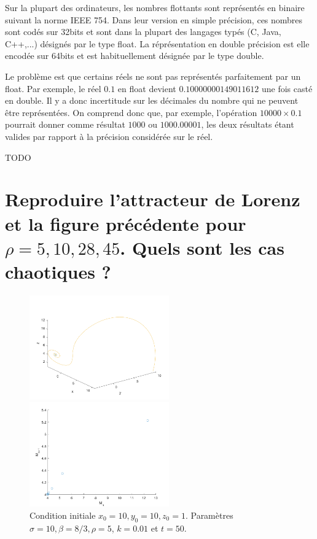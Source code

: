 \documentclass[a4paper, 12pt]{report}
\newcommand{\code}[1]{\textsf{#1}}
\begin{document}
Sur la plupart des ordinateurs, les nombres flottants sont représentés
en binaire suivant la norme IEEE 754. Dans leur version en simple précision,
ces nombres sont codés sur 32bits et sont dans la plupart des langages typés
(C, Java, C++,...) désignés par le type \code{float}. La réprésentation en
double précision est elle encodée sur 64bits et est habituellement désignée
par le type \code{double}.

Le problème est que certains réels ne sont pas représentés parfaitement
par un \code{float}. Par exemple, le réel $0.1$ en \code{float} devient
$0.10000000149011612$ une fois casté en \code{double}. Il y a donc
incertitude sur les décimales du nombre qui ne peuvent être représentées.
On comprend donc que, par exemple, l'opération $10000 \times 0.1$ pourrait
donner comme résultat $1000$ ou $1000.00001$, les deux résultats étant valides
par rapport à la précision considérée sur le réel.

TODO

\section{Reproduire l'attracteur de Lorenz et la figure précédente pour
$\rho = 5, 10, 28, 45$. Quels sont les cas chaotiques ?}

\begin{figure}[H]
    \centering
    \begin{minipage}[t]{6cm}
        \centering
        \includegraphics[width=6cm]{images/lorenz5.png}
    \end{minipage}\hspace{1cm}
    \begin{minipage}[t]{6cm}
        \centering
        \includegraphics[width=6cm]{images/lorenz_m_5.png}
    \end{minipage}
    \caption{Condition initiale $x_0 = 10, y_0 = 10, z_0=1$. Paramètres $\sigma=10, \beta=8/3, \rho=5$, $k=0.01$ et $t=50$.}
\end{figure}
\end{document}
